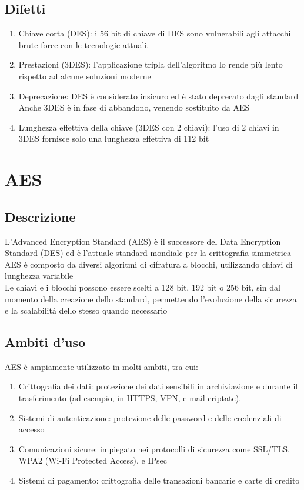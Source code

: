 \documentclass[10pt,oneside,a4paper]{article}
\begin{document}
\subsection{Difetti}
\begin{enumerate}
\item Chiave corta (DES): i 56 bit di chiave di DES sono vulnerabili agli attacchi brute-force con le tecnologie attuali.
\item Prestazioni (3DES): l'applicazione tripla dell'algoritmo lo rende più lento rispetto ad alcune soluzioni moderne
\item Deprecazione: DES è considerato insicuro ed è stato deprecato dagli standard\\
Anche 3DES è in fase di abbandono, venendo sostituito da AES
\item Lunghezza effettiva della chiave (3DES con 2 chiavi): l'uso di 2 chiavi in 3DES fornisce solo una lunghezza effettiva di 112 bit
\end{enumerate}
\section{AES}
\subsection{Descrizione}
L'Advanced Encryption Standard (AES) è il successore del Data Encryption Standard (DES) ed è l'attuale standard mondiale per la crittografia simmetrica\\
AES è composto da diversi algoritmi di cifratura a blocchi, utilizzando chiavi di lunghezza variabile\\
Le chiavi e i blocchi possono essere scelti a 128 bit, 192 bit o 256 bit, sin dal momento della creazione dello standard, permettendo l'evoluzione della sicurezza e la scalabilità dello stesso quando necessario
\subsection{Ambiti d'uso}
AES è ampiamente utilizzato in molti ambiti, tra cui:
\begin{enumerate}
\item Crittografia dei dati: protezione dei dati sensibili in archiviazione e durante il trasferimento (ad esempio, in HTTPS, VPN, e-mail criptate).
\item Sistemi di autenticazione: protezione delle password e delle credenziali di accesso
\item Comunicazioni sicure: impiegato nei protocolli di sicurezza come SSL/TLS, WPA2 (Wi-Fi Protected Access), e IPsec
\item Sistemi di pagamento: crittografia delle transazioni bancarie e carte di credito
\end{enumerate}
\end{document}
